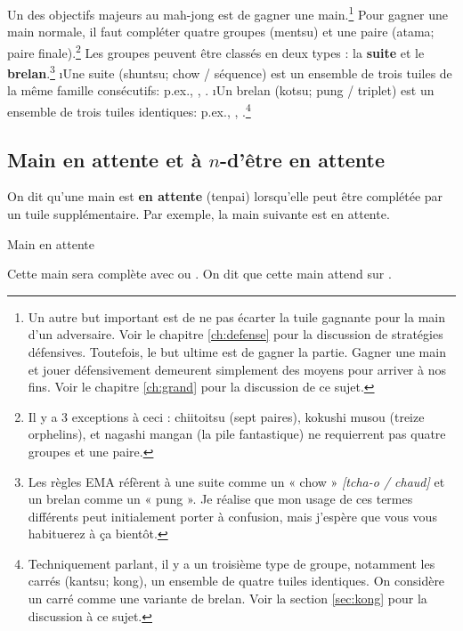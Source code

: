 Un des objectifs majeurs au mah-jong est de gagner une main.\footnote{Un autre but important est de ne pas écarter la tuile gagnante pour la main d'un adversaire. Voir le chapitre \ref{ch:defense} pour la discussion de stratégies défensives. Toutefois, le but ultime est de gagner la partie. Gagner une main et jouer défensivement demeurent simplement des moyens pour arriver à nos fins. Voir le chapitre \ref{ch:grand} pour la discussion de ce sujet.}
Pour gagner une main normale, il faut compléter quatre groupes ({\jap mentsu}) et une paire ({\jap atama}; paire finale).\footnote{Il y a 3 exceptions à ceci : {\jap chiitoitsu} (sept paires), {\jap kokushi musou} (treize orphelins), et {\jap nagashi mangan} (la pile fantastique) ne requierrent pas quatre groupes et une paire.} 
Les groupes peuvent être classés en deux types : la {\bf suite} et le {\bf brelan}.\footnote{Les règles EMA réfèrent à une suite comme un « chow » \textit{[tcha-o / chaud]} et un brelan comme un « pung ». Je réalise que mon usage de ces termes différents peut initialement porter à confusion, mais j'espère que vous vous habituerez à ça bientôt.}
\bi
\i Une suite ({\jap shuntsu}; chow / séquence) est un ensemble de trois tuiles de la même famille consécutifs: p.ex., {\LARGE {}}, {\LARGE {}}. 
\i Un brelan ({\jap kotsu}; pung / triplet) est un ensemble de trois tuiles identiques: p.ex., {\LARGE {}}, {\LARGE \fa\fa\fa}.\footnote{Techniquement parlant, il y a un troisième type de groupe, notamment les carrés ({\jap kantsu}; kong), un ensemble de quatre tuiles identiques. On considère un carré comme une variante de brelan. Voir la section \ref{sec:kong} pour la discussion à ce sujet.} 
\ei
 

\subsection{Main en attente et à $n$-d'être en attente}
	 
On dit qu'une main est {\bf en attente} ({\jap tenpai}) lorsqu'elle peut être complétée par un tuile supplémentaire. Par exemple, la main suivante est en attente. 
\bigskip
\begin{itembox}[r]{Main en attente}
\bp
{}\zhong\zhong\zhong
\ep
\end{itembox}
Cette main sera complète avec {\LARGE{}} ou {\LARGE{}}. On dit que cette main attend sur {\LARGE{} }.

